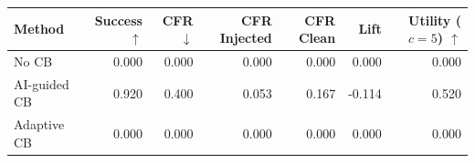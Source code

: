 \begin{tabular}{lrrrrrr}
\toprule
Method & Success $\uparrow$ & CFR $\downarrow$ & CFR Injected & CFR Clean & Lift & Utility ($c=5$) $\uparrow$ \\
\midrule
No CB & 0.000 & 0.000 & 0.000 & 0.000 & 0.000 & 0.000 \\
AI-guided CB & 0.920 & 0.400 & 0.053 & 0.167 & -0.114 & 0.520 \\
Adaptive CB & 0.000 & 0.000 & 0.000 & 0.000 & 0.000 & 0.000 \\
\bottomrule
\end{tabular}
